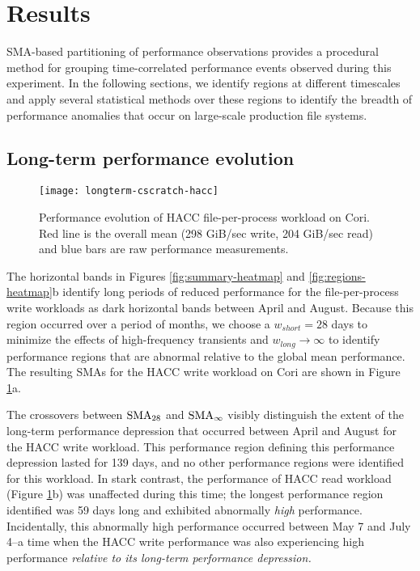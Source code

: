 \section{Results}\label{sec:results}

SMA-based partitioning of performance observations provides a procedural method for grouping time-correlated performance events observed during this experiment.
In the following sections, we identify regions at different timescales and apply several statistical methods over these regions to identify the breadth of performance anomalies that occur on large-scale production file systems.

\subsection{Long-term performance evolution} \label{sec:results/longterm}

\begin{figure}[t]
    \centering
    \texttt{[image: longterm-cscratch-hacc]}
    \vspace{-.35in}
    \caption{Performance evolution of HACC file-per-process workload on Cori.  Red line is the overall mean (298 GiB/sec write, 204 GiB/sec read) and blue bars are raw performance measurements.}
    \label{fig:timeseries-baseline}
\end{figure}

The horizontal bands in Figures \ref{fig:summary-heatmap} and \ref{fig:regions-heatmap}b identify long periods of reduced performance for the file-per-process write workloads as dark horizontal bands between April and August.
Because this region occurred over a period of months, we choose a ${w_{short}} = 28$ days to minimize the effects of high-frequency transients and ${w_{long}} \rightarrow \infty$ to identify performance regions that are abnormal relative to the global mean performance.  The resulting SMAs for the HACC write workload on Cori are shown in Figure \ref{fig:timeseries-baseline}a.

The crossovers between $\textup{SMA}_{28}$ and $\textup{SMA}_{\infty}$ visibly distinguish the extent of the long-term performance depression that occurred between April and August for the HACC write workload.
This performance region defining this performance depression lasted for 139 days, and no other performance regions were identified for this workload.
In stark contrast, the performance of HACC read workload (Figure \ref{fig:timeseries-baseline}b) was unaffected during this time; the longest performance region identified was 59 days long and exhibited abnormally \emph{high} performance.
Incidentally, this abnormally high performance occurred between May 7 and July 4--a time when the HACC write performance was also experiencing high performance \emph{relative to its long-term performance depression.}

